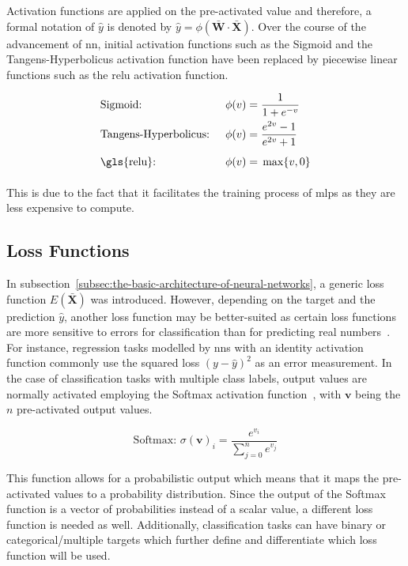 \documentclass[draft,final]{vutinfth} %
\newcommand{\p}[1]{see p. #1}
\begin{document}
    \footnotetext{\cite[\p{13}]{aggarwal_neural_2018}}

    Activation functions are applied on the pre-activated value and therefore, a formal notation of $\hat{y}$ is denoted by $\hat{y}=\phi(\bar{\boldsymbol{W}}\cdot\bar{\boldsymbol{X}})$.
    Over the course of the advancement of \gls{nn}, initial activation functions such as the Sigmoid and the Tangens-Hyperbolicus activation function have been replaced by piecewise linear functions such as the \gls{relu} activation function.

    \begin{align*}
        &\text{Sigmoid: } &  \phi(v) & = \frac{1}{1+e^{-v}} \\
        &\text{Tangens-Hyperbolicus: } &  \phi(v) &= \frac{e^{2v}-1}{e^{2v}+1} \\
        &\text{\gls{relu}: } &  \phi(v)& = \vphantom{\frac11} \max\{v,0\}
    \end{align*}

    This is due to the fact that it facilitates the training process of \glspl{mlp} as they are less expensive to compute.

    \subsection{Loss Functions}\label{subsec:loss-functions}
    In subsection~\ref{subsec:the-basic-architecture-of-neural-networks}, a generic loss function $E(\bar{\boldsymbol{X}})$ was introduced.
    However, depending on the target and the prediction $\hat{y}$, another loss function may be better-suited as certain loss functions are more sensitive to errors for classification than for predicting real numbers~\citep[\p{15}]{aggarwal_neural_2018}.
    For instance, regression tasks modelled by \glspl{nn} with an identity activation function commonly use the squared loss $(y - \hat{y})^2$ as an error measurement.
    In the case of classification tasks with multiple class labels, output values are normally activated employing the Softmax activation function~\citep[\p{78}]{goodfellow_deep_2016}, with $\boldsymbol{v}$ being the $n$ pre-activated output values.

    \[
        \text{Softmax: } \sigma(\boldsymbol{v})_i = \frac{e^{v_i}}{\sum_{j=0}^{n}e^{v_j}}
    \]

    This function allows for a probabilistic output which means that it maps the pre-activated values to a probability distribution.
    Since the output of the Softmax function is a vector of probabilities instead of a scalar value, a different loss function is needed as well.
    Additionally, classification tasks can have binary or categorical/multiple targets which further define and differentiate which loss function will be used.
\end{document}
